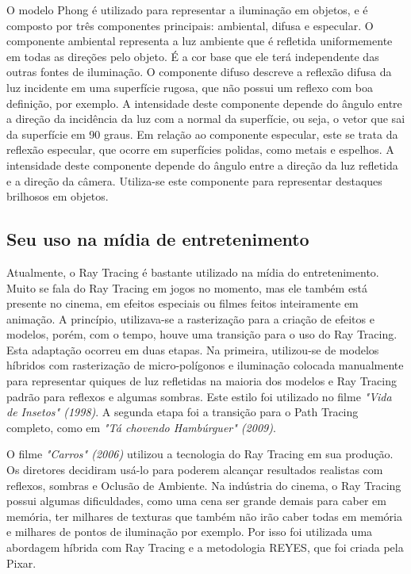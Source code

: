 \documentclass[journal]{IEEEtran}
\begin{document}
O modelo Phong é utilizado para representar a iluminação em objetos, e é composto por
três componentes principais: ambiental, difusa e especular. O componente ambiental 
representa a luz ambiente que é refletida uniformemente em todas as direções pelo objeto.
É a cor base que ele terá independente das outras fontes de iluminação. O componente 
difuso descreve a reflexão difusa da luz incidente em uma superfície rugosa, que não
possui um reflexo com boa definição, por exemplo. A intensidade deste componente depende
do ângulo entre a direção da incidência da luz com a normal da superfície, ou seja, o 
vetor que sai da superfície em 90 graus. Em relação ao componente especular, este se 
trata da reflexão especular, que ocorre em superfícies polidas, como metais e espelhos.
A intensidade deste componente depende do ângulo entre a direção da luz refletida e a 
direção da câmera. Utiliza-se este componente para representar destaques brilhosos em
objetos.

\subsection{Seu uso na mídia de entretenimento}
Atualmente, o Ray Tracing é bastante utilizado na mídia do entretenimento. Muito se 
fala do Ray Tracing em jogos no momento, mas ele também está presente no cinema, em
efeitos especiais ou filmes feitos inteiramente em animação. A princípio, utilizava-se
a rasterização para a criação de efeitos e modelos, porém, com o tempo, houve uma 
transição para o uso do Ray Tracing. Esta adaptação ocorreu em duas
etapas. Na primeira, utilizou-se de modelos híbridos com rasterização de micro-polígonos
e iluminação colocada manualmente para representar quiques de luz refletidas na maioria
dos modelos e Ray Tracing padrão para reflexos e algumas sombras. Este estilo foi utilizado
no filme \emph{"Vida de Insetos" (1998)}. A segunda etapa foi a transição para o Path
Tracing completo, como em \emph{"Tá chovendo Hambúrguer" (2009)}.
\cite{c3} \cite{c1}

O filme \emph{"Carros" (2006)} utilizou a tecnologia do Ray Tracing em sua produção.
Os diretores decidiram usá-lo para poderem alcançar resultados realistas com reflexos,
sombras e Oclusão de Ambiente. Na indústria do cinema, o Ray Tracing possui algumas
dificuldades, como uma cena ser grande demais para caber em memória, ter milhares
de texturas que também não irão caber todas em memória e milhares de pontos de iluminação
por exemplo. Por isso foi utilizada uma abordagem híbrida com Ray Tracing e a metodologia
REYES, que foi criada pela Pixar.
\cite{c9}
\end{document}
